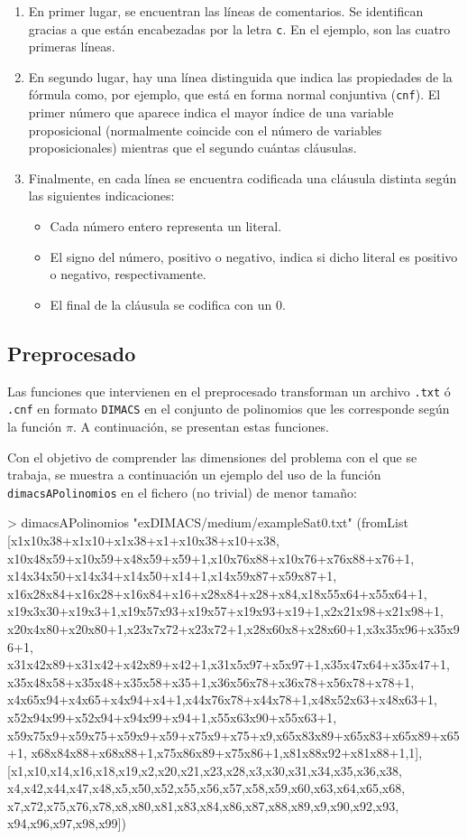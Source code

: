 \begin{enumerate}
\item En primer lugar, se encuentran las líneas de comentarios. Se identifican gracias a que están encabezadas por la letra \texttt{c}. En el ejemplo, son las cuatro primeras líneas.
\item En segundo lugar, hay una línea distinguida que indica las propiedades de la fórmula como, por ejemplo, que está en forma normal conjuntiva (\texttt{cnf}). El primer número que aparece indica el mayor índice de una variable proposicional (normalmente coincide con el número de variables proposicionales) mientras que el segundo cuántas cláusulas. 
\item Finalmente, en cada línea se encuentra codificada una cláusula distinta según las siguientes indicaciones:
\begin{itemize}
\item Cada número entero representa un literal.
\item El signo del número, positivo o negativo, indica si dicho literal es positivo o negativo, respectivamente.
\item El final de la cláusula se codifica con un 0.
\end{itemize} 
\end{enumerate}

\subsection{Preprocesado}

Las funciones que intervienen en el preprocesado transforman un archivo \texttt{.txt} ó \texttt{.cnf} en formato \texttt{DIMACS} en el conjunto de polinomios que les corresponde según la función $\pi$. A continuación, se presentan estas funciones.


Con el objetivo de comprender las dimensiones del problema con el que se trabaja, se muestra a continuación un ejemplo del uso de la función \texttt{dimacsAPolinomios} en el fichero (no trivial) de menor tamaño:

\begin{code}
> dimacsAPolinomios "exDIMACS/medium/exampleSat0.txt"
(fromList [x1x10x38+x1x10+x1x38+x1+x10x38+x10+x38,
x10x48x59+x10x59+x48x59+x59+1,x10x76x88+x10x76+x76x88+x76+1,
x14x34x50+x14x34+x14x50+x14+1,x14x59x87+x59x87+1,
x16x28x84+x16x28+x16x84+x16+x28x84+x28+x84,x18x55x64+x55x64+1,
x19x3x30+x19x3+1,x19x57x93+x19x57+x19x93+x19+1,x2x21x98+x21x98+1,
x20x4x80+x20x80+1,x23x7x72+x23x72+1,x28x60x8+x28x60+1,x3x35x96+x35x96+1,
x31x42x89+x31x42+x42x89+x42+1,x31x5x97+x5x97+1,x35x47x64+x35x47+1,
x35x48x58+x35x48+x35x58+x35+1,x36x56x78+x36x78+x56x78+x78+1,
x4x65x94+x4x65+x4x94+x4+1,x44x76x78+x44x78+1,x48x52x63+x48x63+1,
x52x94x99+x52x94+x94x99+x94+1,x55x63x90+x55x63+1,
x59x75x9+x59x75+x59x9+x59+x75x9+x75+x9,x65x83x89+x65x83+x65x89+x65+1,
x68x84x88+x68x88+1,x75x86x89+x75x86+1,x81x88x92+x81x88+1,1],
[x1,x10,x14,x16,x18,x19,x2,x20,x21,x23,x28,x3,x30,x31,x34,x35,x36,x38,
x4,x42,x44,x47,x48,x5,x50,x52,x55,x56,x57,x58,x59,x60,x63,x64,x65,x68,
x7,x72,x75,x76,x78,x8,x80,x81,x83,x84,x86,x87,x88,x89,x9,x90,x92,x93,
x94,x96,x97,x98,x99])
\end{code}
\newpage

